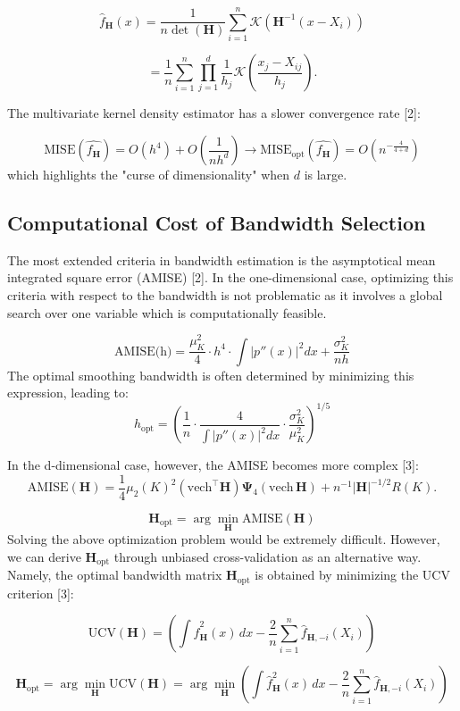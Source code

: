 \documentclass{article}
\begin{document}
$$
\hat{f}_\mathbf{H}(x) = \frac{1}{n \det(\mathbf{H})} \sum_{i=1}^n \mathcal{K}\left(\mathbf{H}^{-1}(x - X_i)\right)
$$

$$
= \frac{1}{n} \sum_{i=1}^n \prod_{j=1}^d \frac{1}{h_j} \mathcal{K}\left(\frac{x_j - X_{ij}}{h_j}\right).
$$

The multivariate kernel density estimator has a slower convergence rate [2]:

$$
\text{MISE}(\hat{f_{\mathbf{H}}}) = O(h^4) + O\left(\frac{1}{nh^d}\right) \rightarrow \text{MISE}_{\text{opt}}(\hat{f_{\mathbf{H}}}) = O\left(n^{-\frac{4}{4+d}}\right)
$$
which highlights the "curse of dimensionality" when $d$ is large.

\subsection{Computational Cost of Bandwidth Selection}

The most extended criteria in bandwidth estimation is the asymptotical mean integrated square error (AMISE) [2]. In the one-dimensional case, optimizing this criteria with respect to the bandwidth is not problematic as it involves a global search over one variable which is computationally feasible.

$$\text{AMISE(h)} = \frac{\mu_K^2}{4} \cdot h^4 \cdot \int \left| p''(x) \right|^2 dx + \frac{\sigma_K^2}{n h}$$ 
The optimal smoothing bandwidth is often determined by minimizing this expression, leading to:
$$h_{\text{opt}} = \left( \frac{1}{n} \cdot \frac{4}{\int \left| p''(x) \right|^2 dx} \cdot \frac{\sigma_K^2}{\mu_K^2} \right)^{1/5}
$$

In the d-dimensional case, however, the AMISE becomes more complex [3]:
$$
\text{AMISE}(\mathbf{H}) = \frac{1}{4} \mu_2(K)^2 \left( \text{vech}^\top \mathbf{H} \right) \mathbf{\Psi}_4 \left( \text{vech} \, \mathbf{H} \right) 
+ n^{-1} \lvert \mathbf{H} \rvert^{-1/2} R(K).
$$

$$
\mathbf{H}_{\text{opt}} = \arg\min_\mathbf{H} \text{AMISE}(\mathbf{H})
$$
Solving the above optimization problem would be extremely difficult. However, we can derive $\mathbf{H}_{\text{opt}}$ through unbiased cross-validation as an alternative way. Namely, the optimal bandwidth matrix $\mathbf{H}_{\text{opt}}$ is obtained by minimizing the UCV criterion [3]:

$$
\text{UCV}(\mathbf{H}) = \left( \int \hat{f}_\mathbf{H}^2(x) \, dx - \frac{2}{n} \sum_{i=1}^n \hat{f}_{\mathbf{H},-i}(X_i) \right)
$$

$$
\mathbf{H}_{\text{opt}} = \arg\min_\mathbf{H} \text{UCV}(\mathbf{H}) = \arg\min_\mathbf{H} \left( \int \hat{f}_\mathbf{H}^2(x) \, dx - \frac{2}{n} \sum_{i=1}^n \hat{f}_{\mathbf{H},-i}(X_i) \right)
$$
\end{document}
